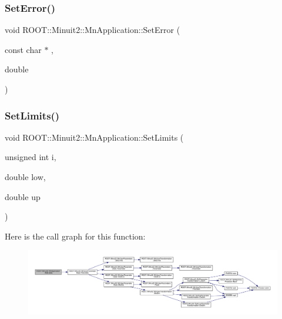 \subsubsection{\texorpdfstring{SetError()}{SetError()}\hspace{0.1cm}{\footnotesize\ttfamily [6/6]}}
{\footnotesize\ttfamily void R\+O\+O\+T\+::\+Minuit2\+::\+Mn\+Application\+::\+Set\+Error (\begin{DoxyParamCaption}\item[{const char $\ast$}]{,  }\item[{double}]{ }\end{DoxyParamCaption})}

\mbox{\label{classROOT_1_1Minuit2_1_1MnApplication_ad6c07174e01b117cb67a43211753ae06}} 
\subsubsection{\texorpdfstring{SetLimits()}{SetLimits()}\hspace{0.1cm}{\footnotesize\ttfamily [1/6]}}
{\footnotesize\ttfamily void R\+O\+O\+T\+::\+Minuit2\+::\+Mn\+Application\+::\+Set\+Limits (\begin{DoxyParamCaption}\item[{unsigned int}]{i,  }\item[{double}]{low,  }\item[{double}]{up }\end{DoxyParamCaption})}

Here is the call graph for this function\+:
\nopagebreak
\begin{figure}[H]
\begin{center}
\leavevmode
\includegraphics[width=350pt]{df/dd5/classROOT_1_1Minuit2_1_1MnApplication_ad6c07174e01b117cb67a43211753ae06_cgraph}
\end{center}
\end{figure}
\mbox{\label{classROOT_1_1Minuit2_1_1MnApplication_ad6c07174e01b117cb67a43211753ae06}} 
